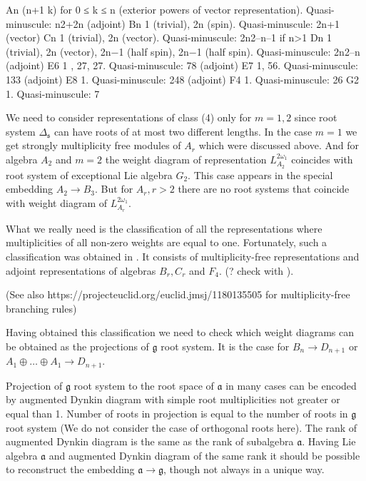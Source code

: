 \documentclass{article}
\newcommand{\gf}{\mathfrak{g}}
\newcommand{\af}{\mathfrak{a}}
\newcommand{\sfr}{\mathfrak{s}}
\begin{document}
    An (n+1
    k) for 0 ≤ k ≤ n (exterior powers of vector representation). Quasi-minuscule: n2+2n (adjoint)
    Bn 1 (trivial), 2n (spin). Quasi-minuscule: 2n+1 (vector)
    Cn 1 (trivial), 2n (vector). Quasi-minuscule: 2n2–n–1 if n>1
    Dn 1 (trivial), 2n (vector), 2n−1 (half spin), 2n−1 (half spin). Quasi-minuscule: 2n2–n (adjoint)
    E6 1 , 27, 27. Quasi-minuscule: 78 (adjoint)
    E7 1, 56. Quasi-minuscule: 133 (adjoint)
    E8 1. Quasi-minuscule: 248 (adjoint)
    F4 1. Quasi-minuscule: 26
    G2 1. Quasi-minuscule: 7


We need to consider representations of class (4) only for $m=1,2$ since root system $\Delta_{\sfr}$
can have roots of at most two different lengths. In the case $m=1$ we get strongly multiplicity free
modules of $A_{r}$ which were discussed above. And for algebra $A_{2}$ and $m=2$ the weight diagram
of representation $L^{2\omega_{1}}_{A_{2}}$ coincides with root system of exceptional Lie algebra
$G_{2}$. This case appears in the special embedding $A_{2}\to B_{3}$. But for $A_{r}, r>2$ there are
no root systems that coincide with weight diagram of $L^{2\omega_{1}}_{A_{r}}$. 


What we really need is the classification of all the representations where multiplicities of all
non-zero weights are equal to one. Fortunately, such a classification was obtained in
\cite{plotkin1998visual}. It consists of multiplicity-free representations and adjoint
representations of algebras $B_{r}, C_{r}$ and $F_{4}$.  (? check with
\cite{berenshtein1990multiplicity}). 



(See also https://projecteuclid.org/euclid.jmsj/1180135505 for multiplicity-free branching rules)

Having obtained this classification we need to check which weight diagrams can be obtained as the
projections of $\gf$ root system. It is the case for $B_{n}\to D_{n+1}$ or $A_{1}\oplus\dots\oplus
A_{1}\to D_{n+1}$.



Projection of $\gf$ root system to the root space of $\af$ in many cases can be
encoded by augmented Dynkin diagram with simple root multiplicities not greater or equal than 1.
Number of roots in projection is equal to the number of roots in $\gf$ root system (We do
not consider the case of orthogonal roots here). The rank of augmented Dynkin diagram is the same as
the rank of subalgebra $\af$. Having Lie algebra $\af$ and augmented Dynkin
diagram of the same rank it should be possible to reconstruct the embedding $\af\to
\gf$, though not always in a unique way. 
\end{document}
